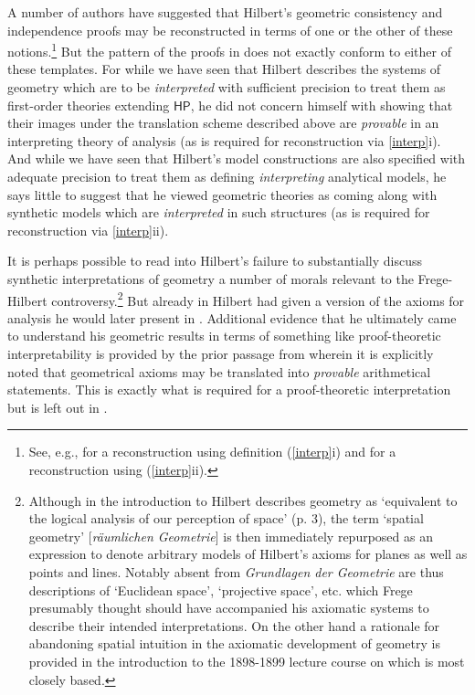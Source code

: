 \documentclass[11pt,fleqn,leqno]{article}
\begin{document}
A number of authors have suggested that Hilbert's geometric consistency and independence proofs may be reconstructed in terms of one or the other of these notions.\footnote{See, e.g., \citep[\S 3.3]{Hallett2010} for a reconstruction using definition (\ref{interp}i) and \citep[\S 4.3]{Eder2018} for a reconstruction using (\ref{interp}ii).}  But the pattern of the proofs in \citeyearpar{Hilbert1899} does not exactly conform to either of these templates.  For while we have seen that Hilbert describes the systems of geometry which are to be \textsl{interpreted} with sufficient precision to treat them as first-order theories extending $\mathsf{HP}$, he did not concern himself with showing that their images under the translation scheme described above are \textsl{provable} in an interpreting theory of analysis (as is required for reconstruction via \ref{interp}i).   And while we have seen that Hilbert's model constructions are also specified with adequate precision to treat them as defining \textsl{interpreting} analytical models, he says little to suggest that he viewed geometric theories as coming along with synthetic models which are \textsl{interpreted} in such structures (as is required for reconstruction via \ref{interp}ii).   

It is perhaps possible to read into Hilbert's failure to substantially discuss synthetic interpretations of geometry a number of morals relevant to the Frege-Hilbert controversy.\footnote{Although in the introduction to \citeyearpar{Hilbert1899} Hilbert describes geometry as `equivalent to the logical analysis of our perception of space' (p. 3), the term `spatial geometry' [\textsl{r\"aumlichen Geometrie}] is then immediately repurposed as an expression to denote arbitrary models of Hilbert's axioms for planes as well as points and lines.   Notably absent from \textsl{Grundlagen der Geometrie} are thus descriptions of `Euclidean space', `projective space', etc. which Frege presumably thought should have accompanied his axiomatic systems to describe their intended interpretations.   On the other hand a rationale for abandoning spatial intuition in the axiomatic development of geometry is provided in the introduction to the 1898-1899 lecture course \citep[pp. 221-223]{Hilbert2004} on which \citeyearpar{Hilbert1899} is most closely based.} But already in \citeyearpar[\S 13]{Hilbert1899} Hilbert had given a version of the axioms for analysis he would later present in \citeyearpar{Hilbert1900a}.   Additional evidence that he ultimately came to understand his geometric results in terms of something like proof-theoretic interpretability is provided by the  prior passage from \citeyearpar{Hilbert1934} wherein it is explicitly noted that geometrical axioms may be translated into \textsl{provable }arithmetical statements. This is exactly what is required for a proof-theoretic interpretation but is left out in \citeyearpar{Hilbert1899}.    
\end{document}
